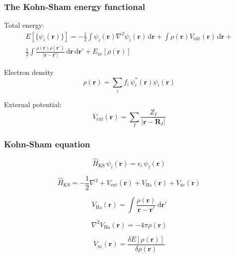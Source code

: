 \documentclass[english,9pt]{beamer}
\begin{document}
\begin{frame}
\frametitle{The Kohn-Sham energy functional}

Total energy:
\begin{eqnarray}
E\left[\{\psi_{i}(\mathbf{r})\}\right] =
-\frac{1}{2} \int \psi_{i}(\mathbf{r}) \nabla^{2} \psi_{i}(\mathbf{r})\,\mathrm{d}\mathbf{r} +
\int \rho(\mathbf{r}) V_{\mathrm{ext}}(\mathbf{r})\,\mathrm{d}\mathbf{r} + \\
\frac{1}{2}\int
\frac{\rho(\mathbf{r}) \rho(\mathbf{r}')}{\left|\mathbf{r}-\mathbf{r}'\right|}\,
\mathrm{d}\mathbf{r}\,\mathrm{d}\mathbf{r}' + E_{\mathrm{xc}}\left[\rho(\mathbf{r})\right]
\end{eqnarray}

Electron density
\begin{equation}
\rho(\mathbf{r}) = \sum_{i} f_{i}\, \psi_{i}^{*}(\mathbf{r}) \psi_{i}(\mathbf{r})
\end{equation}

External potential:
\begin{equation}
V_{\mathrm{ext}}(\mathbf{r}) = \sum_{I} \frac{Z_{I}}{\left|\mathbf{r} - \mathbf{R}_{I}\right|}
\end{equation}

\end{frame}



\begin{frame}
\frametitle{Kohn-Sham equation}

\begin{equation}
\hat{H}_{\mathrm{KS}}\,\psi_{i}(\mathbf{r}) = \epsilon_{i}\,\psi_{i}(\mathbf{r})
\end{equation}

\begin{equation}
\hat{H}_{\mathrm{KS}} = -\frac{1}{2}\nabla^{2} + V_{\mathrm{ext}}(\mathbf{r}) +
V_{\mathrm{Ha}}(\mathbf{r}) + V_{\mathrm{xc}}(\mathbf{r})
\end{equation}

\begin{equation}
V_{\mathrm{Ha}}(\mathbf{r}) = \int
\frac{\rho(\mathbf{r})}{\mathbf{r} - \mathbf{r}'}\,\mathrm{d}\mathbf{r}'
\end{equation}

\begin{equation}
\nabla^2 V_{\mathrm{Ha}}(\mathbf{r}) = -4\pi\rho(\mathbf{r})
\end{equation}

\begin{equation}
V_{\mathrm{xc}}(\mathbf{r}) = \frac{\delta E[\rho(\mathbf{r})]}{\delta \rho(\mathbf{r})}
\end{equation}

\end{frame}
\end{document}
